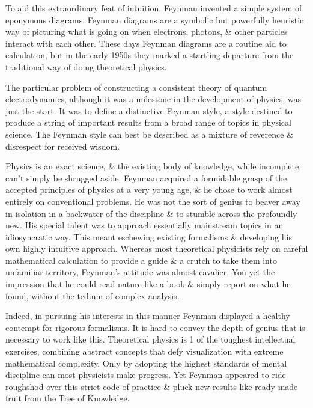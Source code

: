 \documentclass{article}
\begin{document}
To aid this extraordinary feat of intuition, {\sc Feynman} invented a simple system of eponymous diagrams. {\sc Feynman} diagrams are a symbolic but powerfully heuristic way of picturing what is going on when electrons, photons, \& other particles interact with each other. These days {\sc Feynman} diagrams are a routine aid to calculation, but in the early 1950s they marked a startling departure from the traditional way of doing theoretical physics.

The particular problem of constructing a consistent theory of quantum electrodynamics, although it was a milestone in the development of physics, was just the start. It was to define a distinctive {\sc Feynman} style, a style destined to produce a string of important results from a broad range of topics in physical science. The {\sc Feynman} style can best be described as a mixture of reverence \& disrespect for received wisdom.

Physics is an exact science, \& the existing body of knowledge, while incomplete, can't simply be shrugged aside. {\sc Feynman} acquired a formidable grasp of the accepted principles of physics at a very young age, \& he chose to work almost entirely on conventional problems. He was not the sort of genius to beaver away in isolation in a backwater of the discipline \& to stumble across the profoundly new. His special talent was to approach essentially mainstream topics in an idiosyncratic way. This meant eschewing existing formalisms \& developing his own highly intuitive approach. Whereas most theoretical physicists rely on careful mathematical calculation to provide a guide \& a crutch to take them into unfamiliar territory, {\sc Feynman}'s attitude was almost cavalier. You yet the impression that he could read nature like a book \& simply report on what he found, without the tedium of complex analysis.

Indeed, in pursuing his interests in this manner {\sc Feynman} displayed a healthy contempt for rigorous formalisms. It is hard to convey the depth of genius that is necessary to work like this. Theoretical physics is 1 of the toughest intellectual exercises, combining abstract concepts that defy visualization with extreme mathematical complexity. Only by adopting the highest standards of mental discipline can most physicists make progress. Yet {\sc Feynman} appeared to ride roughshod over this strict code of practice \& pluck new results like ready-made fruit from the Tree of Knowledge.
\end{document}
